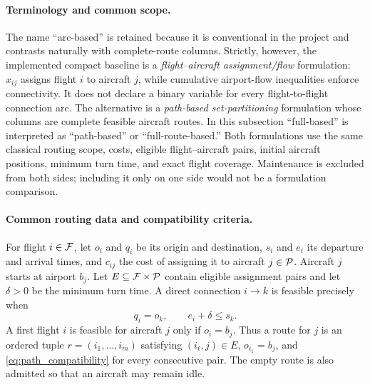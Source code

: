 \paragraph{Terminology and common scope.}
The name ``arc-based'' is retained because it is conventional in the project
and contrasts naturally with complete-route columns.  Strictly, however, the
implemented compact baseline is a \emph{flight--aircraft assignment/flow}
formulation: $x_{ij}$ assigns flight $i$ to aircraft $j$, while cumulative
airport-flow inequalities enforce connectivity.  It does not declare a binary
variable for every flight-to-flight connection arc.  The alternative is a
\emph{path-based set-partitioning} formulation whose columns are complete
feasible aircraft routes.  In this subsection ``full-based'' is interpreted as
``path-based'' or ``full-route-based.''  Both formulations use the same
classical routing scope, costs, eligible flight--aircraft pairs, initial
aircraft positions, minimum turn time, and exact flight coverage.  Maintenance
is excluded from both sides; including it only on one side would not be a
formulation comparison.

\paragraph{Common routing data and compatibility criteria.}
For flight $i\in\mathcal{F}$, let $o_i$ and $q_i$ be its origin and destination,
$s_i$ and $e_i$ its departure and arrival times, and $c_{ij}$ the cost of
assigning it to aircraft $j\in\mathcal{P}$.  Aircraft $j$ starts at airport $b_j$.
Let $E\subseteq\mathcal{F}\times\mathcal{P}$ contain eligible assignment pairs and let
$\delta>0$ be the minimum turn time.  A direct connection $i\rightarrow k$
is feasible precisely when
\begin{equation}
  q_i=o_k, \qquad e_i+\delta\leq s_k.
  \label{eq:path_compatibility}
\end{equation}
A first flight $i$ is feasible for aircraft $j$ only if $o_i=b_j$.  Thus a
route for $j$ is an ordered tuple $r=(i_1,\ldots,i_m)$ satisfying
$(i_\ell,j)\in E$, $o_{i_1}=b_j$, and
\eqref{eq:path_compatibility} for every consecutive pair.  The empty route is
also admitted so that an aircraft may remain idle.

